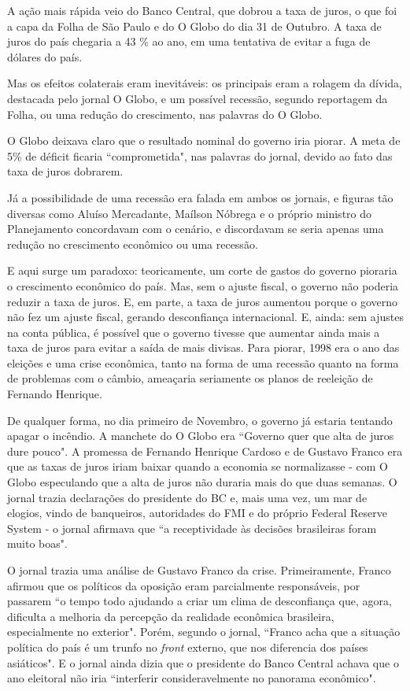 \documentclass{article}
\begin{document}
A ação mais rápida veio do Banco Central, que dobrou a taxa de juros, o que foi a capa da Folha de São Paulo e do O Globo do dia 31 de Outubro. A taxa de juros do país chegaria a 43 \% ao ano, em uma tentativa de evitar a fuga de dólares do país.  

Mas os efeitos colaterais eram inevitáveis: os principais eram a rolagem da dívida, destacada pelo jornal O Globo, e um possível recessão, segundo reportagem da Folha, ou uma redução do crescimento, nas palavras do O Globo. 

O Globo deixava claro que o resultado nominal do governo iria piorar. A meta de 5\% de déficit ficaria ``comprometida", nas palavras do jornal, devido ao fato das taxa de juros dobrarem.   
 
Já a possibilidade de uma recessão era falada em ambos os jornais, e figuras tão diversas como Aluíso Mercadante, Maílson Nóbrega e o próprio ministro do Planejamento concordavam com o cenário, e discordavam se seria apenas uma redução no crescimento econômico ou uma recessão.

E aqui surge um paradoxo: teoricamente, um corte de gastos do governo pioraria o crescimento econômico do país. Mas, sem o ajuste fiscal, o governo não poderia reduzir a taxa de juros. E, em parte, a taxa de juros aumentou porque o governo não fez um ajuste fiscal, gerando desconfiança internacional. E, ainda: sem ajustes na conta pública, é possível que o governo tivesse que aumentar ainda mais a taxa de juros para evitar a saída de mais divisas. Para piorar, 1998 era o ano das eleições e uma crise econômica, tanto na forma de uma recessão quanto na forma de problemas com o câmbio, ameaçaria seriamente os planos de reeleição de Fernando Henrique. 

De qualquer forma, no dia primeiro de Novembro, o governo já estaria tentando apagar o incêndio. A manchete do O Globo era ``Governo quer que alta de juros dure pouco". A promessa de Fernando Henrique Cardoso e de Gustavo Franco era que as taxas de juros iriam baixar quando a economia se normalizasse - com O Globo especulando que a alta de juros não duraria mais do que duas semanas. O jornal trazia declarações do presidente do BC e, mais uma vez, um mar de elogios, vindo de banqueiros, autoridades do FMI e do próprio Federal Reserve System - o jornal afirmava que ``a receptividade às decisões brasileiras foram muito boas".

O jornal trazia uma análise de Gustavo Franco da crise. Primeiramente, Franco afirmou que os políticos da oposição eram parcialmente responsáveis, por passarem ``o tempo todo ajudando a criar um clima de desconfiança que, agora, dificulta a melhoria da percepção da realidade econômica brasileira, especialmente no exterior". Porém, segundo o jornal, ``Franco acha que a situação política do país é um trunfo no \textit{front} externo, que nos diferencia dos países asiáticos". E o jornal ainda dizia que o presidente do Banco Central achava que o ano eleitoral não iria ``interferir consideravelmente no panorama econômico".  
\end{document}
